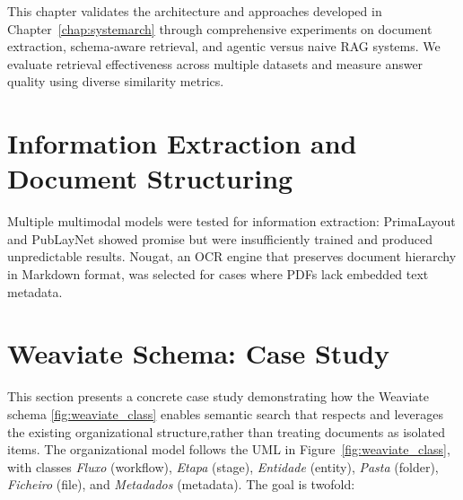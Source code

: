 \label{chap:results}

This chapter validates the architecture and approaches developed in Chapter~\ref{chap:systemarch} through comprehensive experiments on document extraction, schema-aware retrieval, and agentic versus naive \gls{RAG} systems. We evaluate retrieval effectiveness across multiple datasets and measure answer quality using diverse similarity metrics.

\section{Information Extraction and Document Structuring}

Multiple multimodal models were tested for information extraction: PrimaLayout and PubLayNet showed promise but were insufficiently trained and produced unpredictable results. Nougat, an OCR engine that preserves document hierarchy in Markdown format, was selected for cases where PDFs lack embedded text metadata.
\section{Weaviate Schema: Case Study}
\label{sec:schema_example_study}

This section presents a concrete case study demonstrating how the Weaviate schema \ref{fig:weaviate_class} enables semantic search that respects and leverages the existing organizational structure,rather than treating documents as isolated items. The organizational model follows the UML in Figure~\ref{fig:weaviate_class}, with classes \textit{Fluxo} (workflow), \textit{Etapa} (stage), \textit{Entidade} (entity), \textit{Pasta} (folder), \textit{Ficheiro} (file), and \textit{Metadados} (metadata). The goal is twofold:


